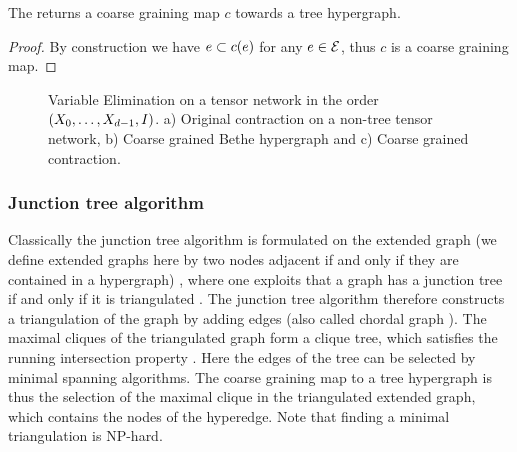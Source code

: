 \begin{lemma}
    The  returns a coarse graining map $c$ towards a tree hypergraph.
\end{lemma}
\begin{proof}
    By construction we have $e\subset c(e)$ for any $e\in\mathcal{E}$, thus $c$ is a coarse graining map.

\end{proof}

\begin{figure}
    
    \caption{Variable Elimination on a tensor network in the order $(X_{0},\ldots,X_{d-1},I)$.
    a) Original contraction on a non-tree tensor network, b) Coarse grained Bethe hypergraph and c) Coarse grained contraction.
    }
\end{figure}

\subsubsection{Junction tree algorithm}

Classically the junction tree algorithm is formulated on the extended graph (we define extended graphs here by two nodes adjacent if and only if they are contained in a hypergraph) \cite{lauritzen_local_1988}, where one exploits that a graph has a junction tree if and only if it is triangulated \cite{lauritzen_graphical_1996}.
The junction tree algorithm therefore constructs a triangulation of the graph by adding edges (also called chordal graph \cite{koller_probabilistic_2009}).
The maximal cliques of the triangulated graph form a clique tree, which satisfies the running intersection property \cite{koller_probabilistic_2009}.
Here the edges of the tree can be selected by minimal spanning algorithms.
The coarse graining map to a tree hypergraph is thus the selection of the maximal clique in the triangulated extended graph, which contains the nodes of the hyperedge.
Note that finding a minimal triangulation is $\mathrm{NP}$-hard.


